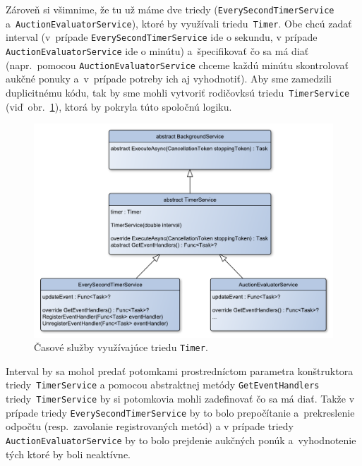 Zároveň si všimnime, že tu už máme dve triedy (\verb|EverySecondTimerService| a~\verb|AuctionEvaluatorService|), ktoré by využívali triedu~\verb|Timer|. Obe chcú zadať interval (v~prípade \verb|EverySecondTimerService| ide o sekundu, v prípade \verb|AuctionEvaluatorService| ide o minútu) a~špecifikovať čo sa má diať (napr.~pomocou \verb|AuctionEvaluatorService| chceme každú minútu skontrolovať aukčné ponuky a~v~prípade potreby ich aj vyhodnotiť). Aby sme zamedzili duplicitnému kódu, tak by sme mohli vytvoriť rodičovksú triedu~\verb|TimerService| (viď~obr.~\ref{timer services uml}), ktorá by pokryla túto spoločnú logiku.

\begin{figure}[H]\centering
\includegraphics[width=140mm]{../img/timer services uml}
\caption{Časové služby využívajúce triedu \texttt{Timer}.}
\label{timer services uml}
\end{figure}

Interval by sa mohol predať potomkami prostredníctom parametra konštruktora triedy~\verb|TimerService| a pomocou abstraktnej metódy \verb|GetEventHandlers| triedy~\verb|TimerService| by si potomkovia mohli zadefinovať čo sa má diať. Takže v prípade triedy \verb|EverySecondTimerService| by to bolo prepočítanie a~prekreslenie odpočtu (resp.~zavolanie registrovaných metód) a v prípade triedy \verb|AuctionEvaluatorService| by to bolo prejdenie aukčných ponúk a~vyhodnotenie tých ktoré by boli neaktívne.

